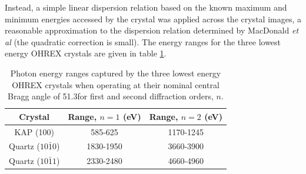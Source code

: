 Instead, a simple linear dispersion relation based on the known maximum and minimum energies accessed by the crystal was applied across the crystal images, a reasonable approximation to the dispersion relation determined by MacDonald \textit{et al} \cite{macdonaldAbsoluteThroughputCalibration2021} (the quadratic correction is small). The energy ranges for the three lowest energy OHREX crystals are given in table \ref{tab:dispersion}.
\begin{table}
	\centering
	\begin{tabular}{ccc}
		\hline \hline
		Crystal               & Range, $n=1$ (eV) & Range, $n=2$ (eV) \\ \hline
		KAP (100)             & 585-625          & 1170-1245        \\
		Quartz ($10\bar{1}0$) & 1830-1950        & 3660-3900        \\
		Quartz ($10\bar{1}1$) & 2330-2480        & 4660-4960  \\     \hline \hline
	\end{tabular}
	\caption{\label{tab:dispersion} Photon energy ranges captured by the three lowest energy OHREX crystals when operating at their nominal central Bragg angle of 51.3\degree for first and second diffraction orders, $n$.}
\end{table}

